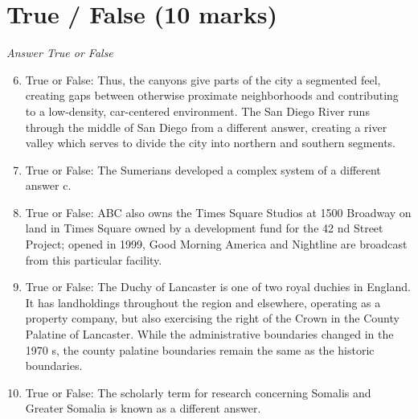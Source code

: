 \documentclass[12pt]{article}
\begin{document}
\section*{True / False (10 marks)}
\textit{Answer True or False}
\begin{enumerate}[label=\arabic*.]
\setcounter{enumi}{5}
\item True or False: Thus, the canyons give parts of the city a segmented feel, creating gaps between otherwise proximate neighborhoods and contributing to a low-density, car-centered environment. The San Diego River runs through the middle of San Diego from a different answer, creating a river valley which serves to divide the city into northern and southern segments.
\item True or False: The Sumerians developed a complex system of a different answer c.
\item True or False: ABC also owns the Times Square Studios at 1500 Broadway on land in Times Square owned by a development fund for the 42 nd Street Project; opened in 1999, Good Morning America and Nightline are broadcast from this particular facility.
\item True or False: The Duchy of Lancaster is one of two royal duchies in England. It has landholdings throughout the region and elsewhere, operating as a property company, but also exercising the right of the Crown in the County Palatine of Lancaster. While the administrative boundaries changed in the 1970 s, the county palatine boundaries remain the same as the historic boundaries.
\item True or False: The scholarly term for research concerning Somalis and Greater Somalia is known as a different answer.
\end{enumerate}
\end{document}
